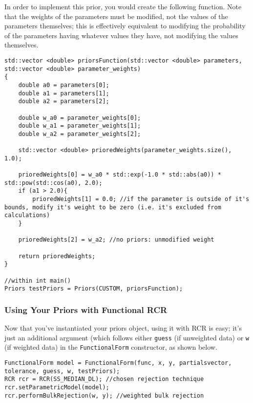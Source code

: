 \documentclass[12pt]{article}
\newcommand{\li}{\lstinline}
\begin{document}
\newpage
In order to implement this prior, you would create the following function. Note that the weights of the parameters must be modified, not the values of the parameters themselves; this is effectively equivalent to modifying the probability of the parameters having whatever values they have, not modifying the values themselves.
\begin{lstlisting}
std::vector <double> priorsFunction(std::vector <double> parameters, std::vector <double> parameter_weights)
{
	double a0 = parameters[0];
	double a1 = parameters[1];
	double a2 = parameters[2];

	double w_a0 = parameter_weights[0];
	double w_a1 = parameter_weights[1];
	double w_a2 = parameter_weights[2];

	std::vector <double> prioredWeights(parameter_weights.size(), 1.0);
	
	prioredWeights[0] = w_a0 * std::exp(-1.0 * std::abs(a0)) * std::pow(std::cos(a0), 2.0);
	if (a1 > 2.0){
		prioredWeights[1] = 0.0; //if the parameter is outside of it's bounds, modify it's weight to be zero (i.e. it's excluded from calculations)
	}
	
	prioredWeights[2] = w_a2; //no priors: unmodified weight
	
	return prioredWeights;
}

//within int main()
Priors testPriors = Priors(CUSTOM, priorsFunction);
\end{lstlisting}
\subsubsection{Using Your Priors with Functional RCR}
\par Now that you've instantiated your priors object, using it with RCR is easy; it's just an additional argument (which follows either \li{guess} (if unweighted data) or \li{w} (if weighted data) in the \li{FunctionalForm} constructor, as shown below.
\begin{lstlisting}
FunctionalForm model = FunctionalForm(func, x, y, partialsvector, tolerance, guess, w, testPriors);
RCR rcr = RCR(SS_MEDIAN_DL); //chosen rejection technique
rcr.setParametricModel(model);
rcr.performBulkRejection(w, y); //weighted bulk rejection
\end{lstlisting}
\end{document}
